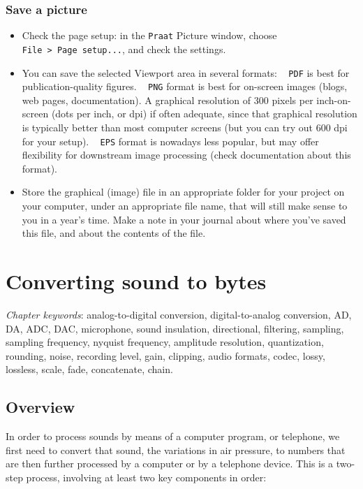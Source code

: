 \documentclass[
]{book}
\begin{document}
\subsection{Save a picture}\label{save-a-picture}

\begin{itemize}
\item
  Check the page setup: in the \texttt{Praat} Picture window, choose \texttt{File\ \textgreater{}\ Page\ setup...}, and check the settings.
\item
  You can save the selected Viewport area in several formats: ~
  \texttt{PDF} is best for publication-quality figures. ~
  \texttt{PNG} format is best for on-screen images (blogs, web pages, documentation). A graphical resolution of 300 pixels per inch-on-screen (dots per inch, or dpi) if often adequate, since that graphical resolution is typically better than most computer screens (but you can try out 600 dpi for your setup). ~
  \texttt{EPS} format is nowadays less popular, but may offer flexibility for downstream image processing (check documentation about this format).
\item
  Store the graphical (image) file in an appropriate folder for your project on your computer, under an appropriate file name, that will still make sense to you in a year's time. Make a note in your journal about where you've saved this file, and about the contents of the file.
\end{itemize}

\chapter{Converting sound to bytes}\label{ch-soundtobytes}

\emph{Chapter keywords}: analog-to-digital conversion, digital-to-analog conversion, AD, DA, ADC, DAC, microphone, sound insulation, directional, filtering, sampling, sampling frequency, nyquist frequency, amplitude resolution, quantization, rounding, noise, recording level, gain, clipping, audio formats, codec, lossy, lossless, scale, fade, concatenate, chain.

\section{Overview}\label{sec:ADCoverview}

In order to process sounds by means of a computer program, or telephone, we first need to convert that sound, the variations in air pressure, to numbers that are then further processed by a computer or by a telephone device. This is a two-step process, involving at least two key components in order:
\end{document}
